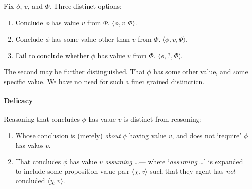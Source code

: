 \begin{assumption}
  Fix \(\phi\), \(v\), and \(\Phi\).
  Three distinct options:
  \begin{enumerate}
  \item Conclude \(\phi\) has value \(v\) from \(\Phi\).
    \(\langle \phi,v,\Phi \rangle\).
  \item
    Conclude \(\phi\) has some value other than \(v\) from \(\Phi\).
    \(\langle \phi,\overline{v},\Phi \rangle\).
  \item
    Fail to conclude whether \(\phi\) has value \(v\) from \(\Phi\).
    \(\langle \phi,?,\Phi \rangle\).
  \end{enumerate}
  The second may be further distinguished.
  That \(\phi\) has some other value, and some specific value.
  We have no need for such a finer grained distinction.
\end{assumption}


\paragraph{Delicacy}

\begin{note}
  Reasoning that concludes \(\phi\) has value \(v\) is distinct from reasoning:
  \begin{enumerate}[label=\Alph*., ref=(\Alph*)]
  \item
    \label{CS:delicacy:O}
    Whose conclusion is (merely) \emph{about} \(\phi\) having value \(v\), and does not `require' \(\phi\) has value \(v\).
  \item
    \label{CS:delicacy:A}
    That concludes \(\phi\) has value \(v\) \emph{assuming} \dots\space --- where `\emph{assuming} \dots\space' is expanded to include some proposition-value pair \(\langle \chi,v \rangle\) such that they agent has \emph{not} concluded \(\langle \chi,v \rangle\).
  \end{enumerate}
\end{note}

